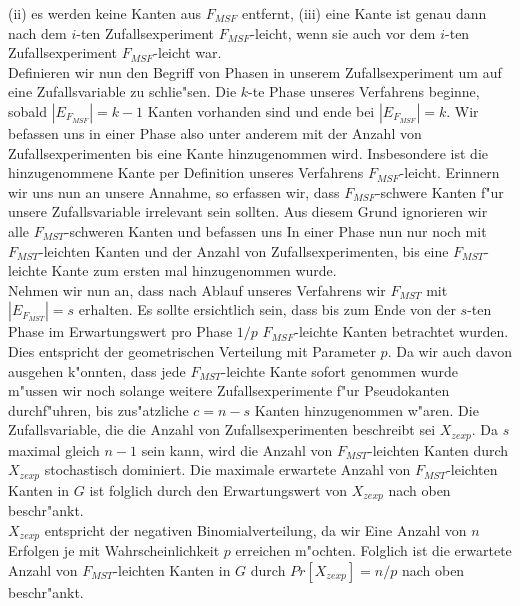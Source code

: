     (ii) es werden keine Kanten aus $F_{MSF}$ entfernt,
    (iii) eine Kante ist genau dann nach dem $i$-ten Zufallsexperiment 
    $F_{MSF}$-leicht, wenn sie auch vor dem $i$-ten Zufallsexperiment $F_{MSF}$-leicht
    war.\\
Definieren wir nun den Begriff von Phasen in unserem Zufallsexperiment um auf
    eine Zufallsvariable zu schlie"sen.
    Die $k$-te Phase unseres Verfahrens beginne, sobald $|E_{F_{MSF}}| = k-1$ Kanten
    vorhanden sind und ende bei $|E_{F_{MSF}}| = k$.
    Wir befassen uns in einer Phase also unter anderem mit der Anzahl von 
    Zufallsexperimenten bis eine Kante hinzugenommen wird.
    Insbesondere ist die hinzugenommene Kante per Definition unseres Verfahrens
    $F_{MSF}$-leicht. Erinnern wir uns nun an unsere Annahme, so erfassen wir,
    dass $F_{MSF}$-schwere Kanten f"ur unsere Zufallsvariable irrelevant sein
    sollten. Aus diesem Grund ignorieren wir alle $F_{MST}$-schweren Kanten und
    befassen uns In einer Phase nun nur noch mit $F_{MST}$-leichten Kanten und
    der Anzahl von Zufallsexperimenten, bis eine $F_{MST}$-leichte Kante zum 
    ersten mal hinzugenommen wurde.\\
Nehmen wir nun an, dass nach Ablauf unseres Verfahrens wir $F_{MST}$ mit
    $|E_{F_{MST}}| = s$ erhalten. Es sollte ersichtlich sein, dass bis zum Ende
    von der $s$-ten Phase im Erwartungswert pro Phase $1/p$ $F_{MSF}$-leichte
    Kanten betrachtet wurden. Dies entspricht der geometrischen Verteilung mit
    Parameter $p$. Da wir auch davon ausgehen k"onnten, dass jede $F_{MST}$-leichte
    Kante sofort genommen wurde m"ussen wir noch solange weitere 
    Zufallsexperimente f"ur Pseudokanten durchf"uhren, bis zus"atzliche 
    $c=n-s$ Kanten hinzugenommen w"aren.
    Die Zufallsvariable, die die Anzahl von Zufallsexperimenten beschreibt sei
    $X_{zexp}$.
    Da $s$ maximal gleich $n-1$ sein kann, wird die Anzahl von $F_{MST}$-leichten
    Kanten durch $X_{zexp}$ stochastisch dominiert.
    Die maximale erwartete Anzahl von $F_{MST}$-leichten Kanten in $G$ ist folglich durch den
    Erwartungswert von $X_{zexp}$ nach oben beschr"ankt.\\
$X_{zexp}$ entspricht der negativen Binomialverteilung, da wir Eine Anzahl von
    $n$ Erfolgen je mit Wahrscheinlichkeit $p$ erreichen m"ochten. 
    Folglich ist die erwartete Anzahl von $F_{MST}$-leichten Kanten in $G$ durch 
    $Pr[X_{zexp}] = n/p$ nach oben beschr"ankt.\\

